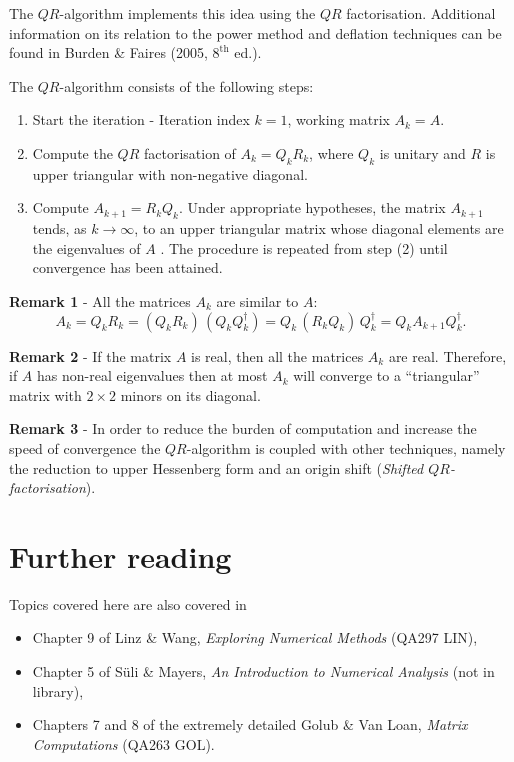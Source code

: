 The $QR$-algorithm implements this idea using the $QR$ factorisation.
Additional information on its relation to the power method and
deflation techniques can be found in Burden \& Faires (2005,
$8^{\textrm{th}}$ ed.).

The $QR$-algorithm consists of the following steps:

\begin{enumerate}
\item Start the iteration - Iteration index $k=1$, working matrix $A_k
  = A$.
\item Compute the $QR$ factorisation of $A_k = Q_k R_k$, where $Q_k$
  is unitary and $R$ is upper triangular with non-negative diagonal.
\item Compute $A_{k+1} = R_k Q_k$.  Under appropriate hypotheses, the
  matrix $A_{k+1}$ tends, as $k \to \infty$, to an upper triangular
  matrix whose diagonal elements are the eigenvalues of $A$ .  The
  procedure is repeated from step (2) until convergence has been
  attained.
\end{enumerate}

\noindent
\textbf{Remark 1} - All the matrices $A_k$ are similar to $A$:
%
\begin{equation*}
  A_k = Q_k R_k = (Q_k R_k) \, (Q_k Q_k^{\dagger}) =
  Q_k \, ( R_k Q_k) \, Q_k^{\dagger} =
  Q_k A_{k+1} Q_k^{\dagger} .
\end{equation*}

\noindent
\textbf{Remark 2} - If the matrix $A$ is real, then all the matrices
$A_k$ are real.  Therefore, if $A$ has non-real eigenvalues then at
most $A_k$ will converge to a ``triangular'' matrix with $2 \times 2$
minors on its diagonal.

\noindent
\textbf{Remark 3} - In order to reduce the burden of computation and
increase the speed of convergence the $QR$-algorithm is coupled with
other techniques, namely the reduction to upper Hessenberg form and an
origin shift (\textit{Shifted $QR$-factorisation}).

\section*{Further reading}

Topics covered here are also covered in
\begin{itemize}
\item Chapter 9 of Linz \& Wang, \textit{Exploring Numerical Methods}
  (QA297 LIN),
\item Chapter 5 of S{\"u}li \& Mayers, \textit{An Introduction to
    Numerical Analysis} (not in library),
\item Chapters 7 and 8 of the extremely detailed Golub \& Van Loan,
  \textit{Matrix Computations} (QA263 GOL).
\end{itemize}
